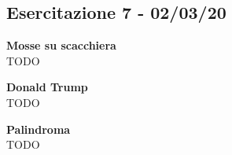 \documentclass[../cheatSheetAlgoritmi.tex]{subfiles}
\begin{document}
\subsection{Esercitazione 7 - 02/03/20}
\textbf{Mosse su scacchiera}\\
TODO

\textbf{Donald Trump}\\
TODO

\textbf{Palindroma}\\
TODO

\newpage
\end{document}
